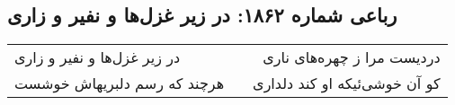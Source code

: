 \begin{center}
\section*{رباعی شماره ۱۸۶۲: در زیر غزل‌ها و نفیر و زاری}
\label{sec:1862}
\begin{longtable}{l p{0.5cm} r}
در زیر غزل‌ها و نفیر و زاری
&&
دردیست مرا ز چهره‌های ناری
\\
هرچند که رسم دلبریهاش خوشست
&&
کو آن خوشی‌ئیکه او کند دلداری
\\
\end{longtable}
\end{center}
